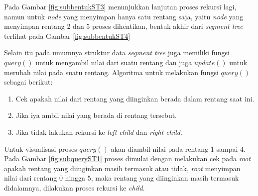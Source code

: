 \quad Pada Gambar \ref{fig:subbentukST3} menunjukkan lanjutan proses rekursi lagi, namun untuk \textit{node} yang menyimpan hanya satu rentang saja, yaitu \textit{node} yang menyimpan rentang 2 dan 5 proses dihentikan, bentuk akhir dari \textit{segment tree} terlihat pada Gambar \ref{fig:subbentukST4}

\quad Selain itu pada umumnya struktur data \textit{segment tree} juga memiliki fungsi \textit{$query()$} untuk mengambil nilai dari suatu rentang dan juga \textit{$update()$} untuk merubah nilai pada suatu rentang.
\quad Algoritma untuk melakukan fungsi \textit{$query()$} sebagai berikut:
\begin{enumerate}
	\item Cek apakah nilai dari rentang yang diinginkan berada dalam rentang saat ini.
	\item Jika iya ambil nilai yang berada di rentang tersebut.
	\item Jika tidak lakukan rekursi ke \textit{left child} dan \textit{right child}.
\end{enumerate}
\quad Untuk visualisasi proses \textit{$query()$} akan diambil nilai pada rentang $1$ sampai $4$. Pada Gambar \ref{fig:subqueryST1} proses dimulai dengan melakukan cek pada \textit{root} apakah rentang yang diinginkan masih termasuk atau tidak, \textit{root} menyimpan nilai dari rentang $0$ hingga $5$, maka rentang yang diinginkan masih termasuk didalamnya, dilakukan proses rekursi ke \textit{child}.
